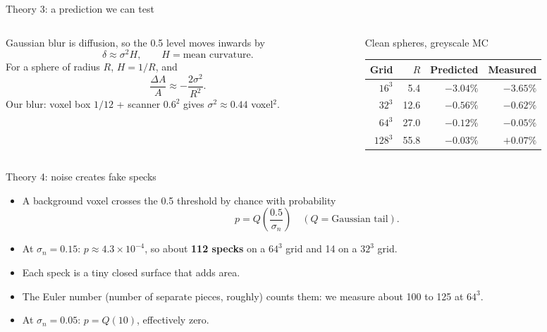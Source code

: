\documentclass[aspectratio=169,11pt]{beamer}
\begin{document}
\begin{frame}{Theory 3: a prediction we can test}
  \begin{columns}[T]
    \begin{column}{0.5\textwidth}
      Gaussian blur is diffusion, so the 0.5 level moves inwards by
      \[ \delta \approx \sigma^2 H, \qquad H = \text{mean curvature}. \]
      For a sphere of radius $R$, $H = 1/R$, and
      \[ \frac{\Delta A}{A} \approx -\frac{2\sigma^2}{R^2}. \]
      Our blur: voxel box $1/12$ + scanner $0.6^2$ gives $\sigma^2 \approx 0.44$ voxel$^2$.
    \end{column}
    \begin{column}{0.46\textwidth}
      \centering\small
      Clean spheres, greyscale MC\\[4pt]
      \begin{tabular}{rrrr}
        \toprule
        Grid & $R$ & Predicted & Measured \\
        \midrule
        $16^3$  & 5.4  & $-3.04\%$ & $-3.65\%$ \\
        $32^3$  & 12.6 & $-0.56\%$ & $-0.62\%$ \\
        $64^3$  & 27.0 & $-0.12\%$ & $-0.05\%$ \\
        $128^3$ & 55.8 & $-0.03\%$ & $+0.07\%$ \\
        \bottomrule
      \end{tabular}
    \end{column}
  \end{columns}
\end{frame}

\begin{frame}{Theory 4: noise creates fake specks}
  \begin{itemize}
    \item A background voxel crosses the 0.5 threshold by chance with probability
          \[ p = Q\!\left(\frac{0.5}{\sigma_n}\right) \quad (Q = \text{Gaussian tail}). \]
    \item At $\sigma_n = 0.15$: $p \approx 4.3\times10^{-4}$, so about \textbf{112 specks} on a
          $64^3$ grid and 14 on a $32^3$ grid.
    \item Each speck is a tiny closed surface that adds area.
    \item The Euler number (number of separate pieces, roughly) counts them: we measure about
          100 to 125 at $64^3$.
    \item At $\sigma_n = 0.05$: $p = Q(10)$, effectively zero.
  \end{itemize}
\end{frame}
\end{document}

